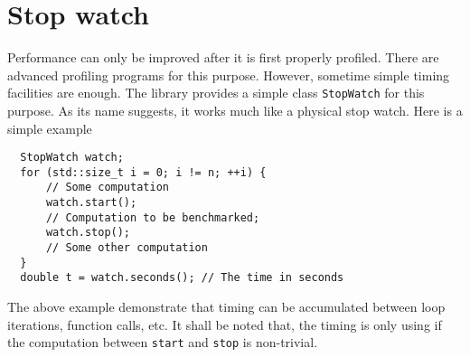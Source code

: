 \section{Stop watch}
\label{sec:Stop watch}

Performance can only be improved after it is first properly profiled. There are
advanced profiling programs for this purpose. However, sometime simple timing
facilities are enough. The library provides a simple class \verb|StopWatch| for
this purpose. As its name suggests, it works much like a physical stop watch.
Here is a simple example
\begin{Verbatim}
  StopWatch watch;
  for (std::size_t i = 0; i != n; ++i) {
      // Some computation
      watch.start();
      // Computation to be benchmarked;
      watch.stop();
      // Some other computation
  }
  double t = watch.seconds(); // The time in seconds
\end{Verbatim}
The above example demonstrate that timing can be accumulated between loop
iterations, function calls, etc. It shall be noted that, the timing is only
using if the computation between \verb|start| and \verb|stop| is non-trivial.
